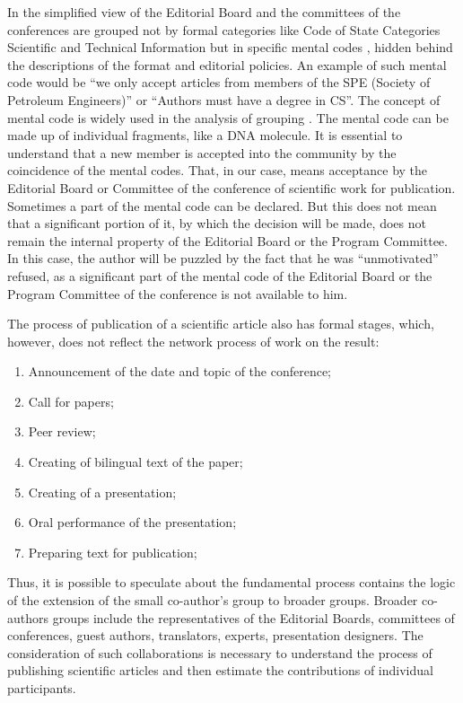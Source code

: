 \documentclass[12pt]{report}
\theoremstyle{definition}
\providecommand{\tightlist}{%
	\setlength{\itemsep}{0pt}\setlength{\parskip}{0pt}}
\begin{document}
In the simplified view of the Editorial Board and the committees of the conferences are grouped not by formal categories like  Code of State Categories Scientific and Technical Information 
but in specific mental codes \cite{gary2016unpacking}, hidden behind the descriptions of the format and editorial policies.
An example of such mental code would be ``we only accept articles from members of the SPE (Society of Petroleum Engineers)'' or ``Authors must have a degree in CS''.
The concept of mental code is widely used in the analysis of grouping \cite{sidor2006g, gentner2014mental}. 
The mental code can be made up of individual fragments, like a DNA molecule. 
It is essential to understand that a new member is accepted into the community by the coincidence of the mental codes. 
That, in our case, means acceptance by the Editorial Board or Committee of the conference of scientific work for publication.
Sometimes a part of the mental code can be declared.
But this does not mean that a significant portion of it, by which the decision will be made, does not remain the internal property of the Editorial Board or the Program Committee.
In this case, the author will be puzzled by the fact that he was ``unmotivated'' refused, as a significant part of the mental code of the Editorial Board or the Program Committee of the conference is not available to him.

The process of publication of a scientific article also has formal stages, which, however, does not reflect the network process of work on the result:
\begin{enumerate}
	\tightlist
	\item Announcement of the date and topic of the conference;
	\item Call for papers;
	\item Peer review;
	\item Creating of bilingual text of the paper;
	\item Creating of a presentation;
	\item Oral performance of the presentation;
	\item Preparing text for publication;
\end{enumerate}

Thus, it is possible to speculate about the fundamental process contains the logic of the extension of the small co-author's group to broader groups.
Broader co-authors groups include the representatives of the Editorial Boards, committees of conferences, guest authors, translators, experts, presentation designers.
The consideration of such collaborations is necessary to understand the process of publishing scientific articles and then estimate the contributions of individual participants.
\end{document}
